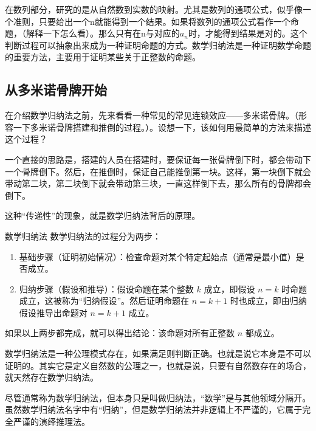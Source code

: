 
\begin{issues}
\issueDraft
\end{issues}



在数列部分，研究的是从自然数到实数的映射。尤其是数列的通项公式，似乎像一个准则，只要给出一个n就能得到一个结果。如果将数列的通项公式看作一个命题，（解释一下怎么看）。那么只有在n与对应的$a_n$时，才能得到结果是对的。这个判断过程可以抽象出来成为一种证明命题的方式。数学归纳法是一种证明数学命题的重要方法，主要用于证明某些关于正整数的命题。

\subsection{从多米诺骨牌开始}

在介绍数学归纳法之前，先来看看一种常见的常见连锁效应——多米诺骨牌。（形容一下多米诺骨牌搭建和推倒的过程。）。设想一下，该如何用最简单的方法来描述这个过程？

一个直接的思路是，搭建的人员在搭建时，要保证每一张骨牌倒下时，都会带动下一个骨牌倒下。然后，在推倒时，保证自己能推倒第一块。这样，第一块倒下就会带动第二块，第二块倒下就会带动第三块，一直这样倒下去，那么所有的骨牌都会倒下。

这种“传递性”的现象，就是数学归纳法背后的原理。

\begin{definition}{数学归纳法}
数学归纳法的过程分为两步：
\begin{enumerate}
\item 基础步骤（证明初始情况）：检查命题对某个特定起始点（通常是最小值）是否成立。
\item 归纳步骤（假设和推导）：假设命题在某个整数 $k$ 成立，即假设 $n = k$ 时命题成立，这被称为“归纳假设”。然后证明命题在 $n = k+1$ 时也成立，即由归纳假设推导出命题对 $n = k+1$ 成立。
\end{enumerate}
如果以上两步都完成，就可以得出结论：该命题对所有正整数 $n$ 都成立。
\end{definition}

数学归纳法是一种公理模式存在，如果满足则判断正确。也就是说它本身是不可以证明的。其实它是定义自然数的公理之一，也就是说，只要有自然数存在的场合，就天然存在数学归纳法。

尽管通常称为数学归纳法，但本身只是叫做归纳法，“数学”是与其他领域分隔开。虽然数学归纳法名字中有“归纳”，但是数学归纳法并非逻辑上不严谨的，它属于完全严谨的演绎推理法。

